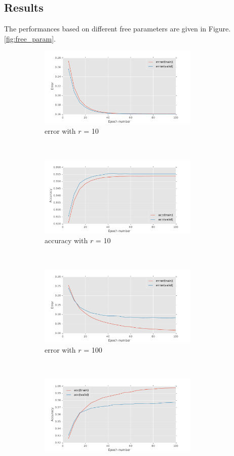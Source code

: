 \documentclass[11pt]{article}
\begin{document}
\subsection{Results}
The performances based on different free parameters are given in  Figure.\ref{fig:free_param}. 
\begin{figure}[t!]
    \centering
    \begin{subfigure}[t]{0.45\textwidth}
        \centering
        \includegraphics[height=1.5in]{error_with_free_param_10.pdf}
        \caption{error with $r$ = 10}
    \end{subfigure}
	~
    \begin{subfigure}[t]{0.45\textwidth}
        \centering
        \includegraphics[height=1.5in]{acc_with_param_10.pdf}
        \caption{accuracy with $r$ = 10}
    \end{subfigure}
	~
    \begin{subfigure}[t]{0.45\textwidth}
        \centering
        \includegraphics[height=1.5in]{error_with_free_param_100.pdf}
        \caption{error with $r$ = 100}
    \end{subfigure}
	~
    \begin{subfigure}[t]{0.45\textwidth}
        \centering
        \includegraphics[height=1.5in]{acc_with_param_100.pdf}

\end{subfigure}
\end{figure}
\end{document}
